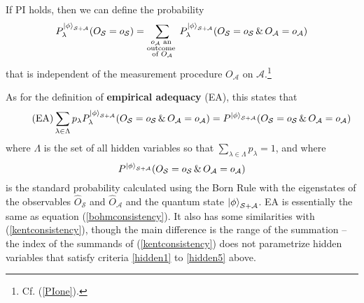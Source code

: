 If PI holds, then we can define the probability
\begin{equation}\label{generalPI}
	P^{\ket{\phi}_{\mathcal{S}+\mathcal{A}}}_{\lambda}(O_\mathcal{S}=o_\mathcal{S})=\sum_{\substack{o_\mathcal{A}\text{ an }\\ \text{outcome }\\ 
	\text{of }O_{\mathcal{A}}}}P_\lambda^{\ket{\phi}_{\mathcal{S}+\mathcal{A}}}(O_\mathcal{S}=o_\mathcal{S}\, \& \,O_\mathcal{A}=o_\mathcal{A})
\end{equation} %
%
that is independent of the measurement procedure $O_\mathcal{A}$ on $\mathcal{A}$.\footnote{Cf. (\ref{PIone}).}


As for the definition of \textbf{empirical adequacy} (EA),  this states that
\begin{equation}\tag{EA}\label{adeq}
	\sum_{\lambda\in\Lambda}p_\lambda P_\lambda^{\ket{\phi}_{\mathcal{S}+\mathcal{A}}}(O_\mathcal{S}=o_\mathcal{S}\, \& \,O_\mathcal{A}=o_\mathcal{A})=P^{\ket{\phi}_{\mathcal{S}+\mathcal{A}}}(O_\mathcal{S}=o_\mathcal{S}\, \& \,O_\mathcal{A}=o_\mathcal{A})
\end{equation}
where $\Lambda$ is the set of all hidden variables so that $\sum_{\lambda\in\Lambda} p_\lambda = 1$, %
%
 and where 
$$P^{\ket{\phi}_{\mathcal{S}+\mathcal{A}}}(O_\mathcal{S}=o_\mathcal{S}\, \& \,O_\mathcal{A}=o_\mathcal{A})$$ %
%
 is the standard probability calculated using the Born Rule with the eigenstates of the observables $\hat{O}_\mathcal{S}$ and $\hat{O}_\mathcal{A}$ and the quantum state $\ket{\phi}_{\mathcal{S}+\mathcal{A}}$. EA is essentially the same as equation (\ref{bohmconsistency}). It also has some similarities with (\ref{kentconsistency}), though the main difference is the range of the summation -- the index of the summands of (\ref{kentconsistency}) does not parametrize hidden variables that satisfy criteria \ref{hidden1} to \ref{hidden5} above.

